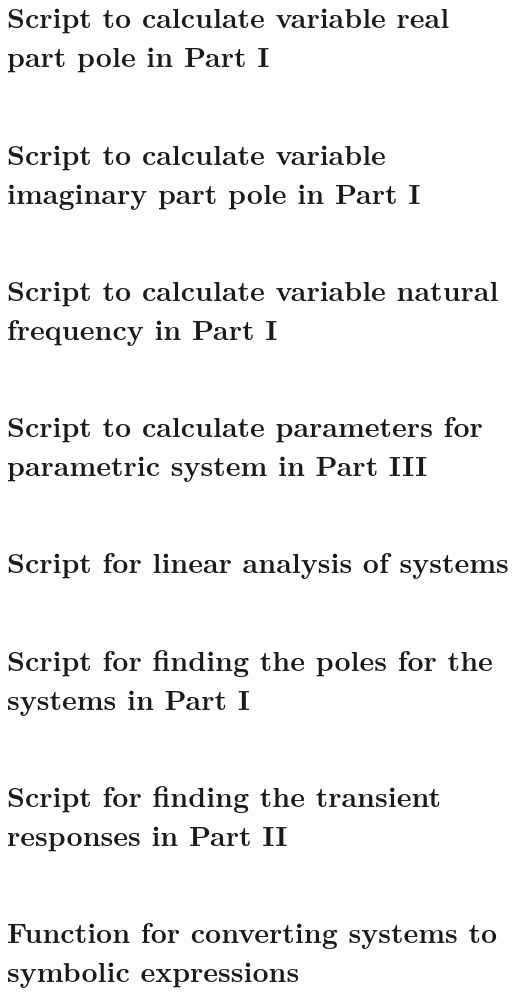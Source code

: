 \documentclass[11pt]{article}
\begin{document}
\section{Script to calculate variable real part pole in Part I}
\inputminted{matlab}{lab0405/programs/part0102_reals_m1.m}

\section{Script to calculate variable imaginary part pole in Part I}
\inputminted{matlab}{lab0405/programs/part0103_imags_m1.m}

\section{Script to calculate variable natural frequency in Part I}
\inputminted{matlab}{lab0405/programs/part0104_nat_freqs_m1.m}

\section{Script to calculate parameters for parametric system in Part III}\label{apx:last param}
\inputminted{matlab}{lab0405/programs/part03_params_m1.m}

\section{Script for linear analysis of systems}\label{apx:linear analysis}
\inputminted{matlab}{lab0405/programs/lin_analysis_m1.m}

\section{Script for finding the poles for the systems in Part I}\label{apx:part 01 pz map}
\inputminted{matlab}{lab0405/programs/part01_poles_zeros_m1.m}

\section{Script for finding the transient responses in Part II}\label{apx:part 03 transient responses}
\inputminted{matlab}{lab0405/programs/part02_transient_response_m1.m}

\section{Function for converting systems to symbolic expressions}\label{apx:sys2sym}
\inputminted{matlab}{lab0405/programs/sys2sym.m}
\end{document}
